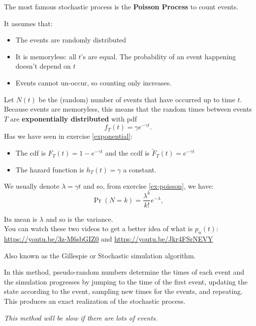\begin{SaveDefinition}[key=Poisson, title={Poisson Process}]

The most famous stochastic process is the \textbf{Poisson Process} to count events. 

It assumes that:
\begin{itemize}
	\item The events are randomly distributed
	\item It is memoryless: all $t$'s are equal. The probability of an event happening doesn't depend on $t$
	\item Events cannot un-occur, so counting only increases.
\end{itemize}


Let $N(t)$ be the (random) number of events that have occurred up to time $t$.
Because events are memoryless, this means that the random times between events $T$ are \textbf{exponentially distributed} with pdf
\[
f_T(t) = \gamma e^{-\gamma t}.
\]
Has we have seen in exercise \ref{exponential}:
\begin{itemize}
	\item The cdf is $F_T(t) = 1-e^{-\gamma t}$ and the ccdf is $\tilde{F}_T(t) = e^{-\gamma t}$
	\item The hazard function is $h_T(t) = \gamma$ a constant.
\end{itemize}	

\end{SaveDefinition}


\begin{SaveDefinition}[key=Poisson2, title={Poisson Process}]

We usually denote $\lambda = \gamma t$ and so, from exercise \ref{ex-poisson}, we have:
\[
\Pr(N=k) = \frac{\lambda^k}{k!} e^{-\lambda},
\]

Its mean is $\lambda$ and so is the variance.\\

You can watch these two videos to get a better idea of what is $p_n(t)$: \url{https://youtu.be/3z-M6sbGIZ0} and \url{https://youtu.be/Jkr4FSrNEVY}
\end{SaveDefinition}



\begin{SaveDefinition}[key=discrete-event, title={Discrete Event Method}]

Also known as the Gillespie or Stochastic simulation algorithm.

In this method, pseudo-random numbers determine the times of each event and the simulation progresses by jumping to the time of the first event, updating the state according to the event, sampling new times for the events, and repeating. This produces an exact realization of the stochastic process.

\textit{This method will be slow if there are lots of events.}
\end{SaveDefinition}


